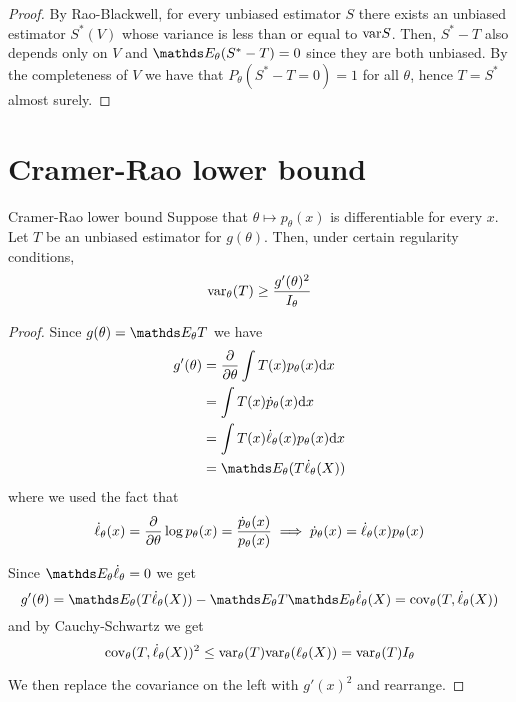 \documentclass[12pt]{extarticle}
\begin{document}
\begin{proof}
	By Rao-Blackwell, for every unbiased estimator $S$ there exists an unbiased estimator $S^*(V)$
	whose variance is less than or equal to $\var S$.
	Then, $S^* - T$ also depends only on $V$ and $\E_\theta(S^* - T) = 0$ since they are both unbiased.
	By the completeness of $V$ we have that $P_\theta(S^* - T = 0) = 1$ for all $\theta$,
	hence $T = S^*$ almost surely.
\end{proof}

\section{Cramer-Rao lower bound}

\begin{theorem}{Cramer-Rao lower bound}{}
	Suppose that $\theta \mapsto p_\theta(x)$ is differentiable for every $x$.
	Let $T$ be an unbiased estimator for $g(\theta)$.
	Then, under certain regularity conditions,
	\begin{equation}
		\var_\theta (T) \geq \frac{g'(\theta)^2}{I_\theta}
	\end{equation}
\end{theorem}

\begin{proof}
	Since $g(\theta) = \E_\theta T$ we have
	\begin{align}
		g'(\theta) & = \pdv{\theta} \int T(x) p_\theta(x) \dd x        \\
		           & = \int T(x) \dot{p}_\theta(x) \dd x               \\
		           & = \int T(x) \dot \ell_\theta(x) p_\theta(x) \dd x \\
		           & = \E_\theta (T \dot \ell_\theta (X))
	\end{align}
	where we used the fact that
	\begin{equation}
		\dot \ell_\theta(x) = \pdv{\theta} \log p_\theta(x) = \frac{\dot p_\theta(x)}{p_\theta(x)}
		\implies \dot p_\theta(x) = \dot \ell_\theta(x) p_\theta(x)
	\end{equation}

	Since $\E_\theta \dot \ell_\theta = 0$ we get
	\begin{equation}
		g'(\theta) = \E_\theta (T \dot \ell_\theta (X)) - \E_\theta T \E_\theta \dot \ell_\theta(X) = \cov_\theta(T, \dot \ell_\theta(X))
	\end{equation}
	and by Cauchy-Schwartz we get
	\begin{equation}
		\cov_\theta(T, \dot \ell_\theta(X))^2 \leq \var_\theta (T) \var_\theta (\ell_\theta(X)) = \var_\theta (T) I_\theta
	\end{equation}

	We then replace the covariance on the left with $g'(x)^2$ and rearrange.
\end{proof}
\end{document}
